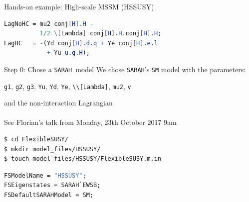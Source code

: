 \documentclass[hyperref={pdfpagelabels=false},ngerman]{beamer}
\newcommand{\SARAH}{\texttt{SARAH}}
\begin{document}
\begin{frame}{Hands-on example: High-scale MSSM (HSSUSY)}
  \begin{center}
  \end{center}
\end{frame}

\newsavebox{\listbox}
\newsavebox{\listboxt}

\begin{lrbox}{\listbox}\begin{lstlisting}[language=Mathematica]
LagNoHC = mu2 conj[H].H -
          1/2 \[Lambda] conj[H].H.conj[H].H;
LagHC   = -(Yd conj[H].d.q + Ye conj[H].e.l
            + Yu u.q.H);
\end{lstlisting}\end{lrbox}

\begin{frame}{Step 0: Chose a \SARAH\ model}
  We chose \SARAH's \texttt{SM} model with the parameters:
  \begin{center}
  \lstinline{g1}, \lstinline{g2}, \lstinline{g3}, \lstinline{Yu},
  \lstinline{Yd}, \lstinline{Ye}, \lstinline{\\[Lambda]},
  \lstinline{mu2}, \lstinline{v}
  \end{center}
  and the non-interaction Lagrangian \\[2em]
  \usebox{\listbox}
  \\[1em]
  See Florian's talk from Monday, 23th October 2017 9am
\end{frame}

\begin{lrbox}{\listbox}\begin{lstlisting}[language=bash]
$ cd FlexibleSUSY/
$ mkdir model_files/HSSUSY/
$ touch model_files/HSSUSY/FlexibleSUSY.m.in
\end{lstlisting}\end{lrbox} %

\begin{lrbox}{\listboxt}\begin{lstlisting}[language=Mathematica]
FSModelName = "HSSUSY";
FSEigenstates = SARAH`EWSB;
FSDefaultSARAHModel = SM;
\end{lstlisting}\end{lrbox}
\end{document}
